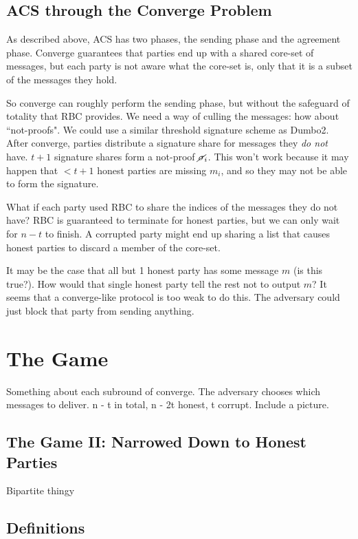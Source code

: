 \documentclass{article}
\begin{document}
\subsection{ACS through the Converge Problem}

As described above, ACS has two phases, the sending phase and the agreement phase. Converge guarantees that parties end up with a shared core-set of messages, but each party is not aware what the core-set is, only that it is a subset of the messages they hold. 

So converge can roughly perform the sending phase, but without the safeguard of totality that RBC provides. We need a way of culling the messages: how about ``not-proofs". We could use a similar threshold signature scheme as Dumbo2. After converge, parties distribute a signature share for messages they \emph{do not} have. $t + 1$ signature shares form a not-proof $\cancel \sigma_i$. This won't work because it may happen that $< t + 1$ honest parties are missing $m_i$, and so they may not be able to form the signature.

What if each party used RBC to share the indices of the messages they do not have? RBC is guaranteed to terminate for honest parties, but we can only wait for $n - t$ to finish. A corrupted party might end up sharing a list that causes honest parties to discard a member of the core-set.

It may be the case that all but 1 honest party has some message $m$ (is this true?). How would that single honest party tell the rest not to output $m$? It seems that a converge-like protocol is too weak to do this. The adversary could just block that party from sending anything.




\section{The Game}
Something about each subround of converge. The adversary chooses which messages to deliver. n - t in total, n - 2t honest, t corrupt. Include a picture.
\subsection{The Game II: Narrowed Down to Honest Parties}
Bipartite thingy

\subsection{Definitions}
\end{document}
